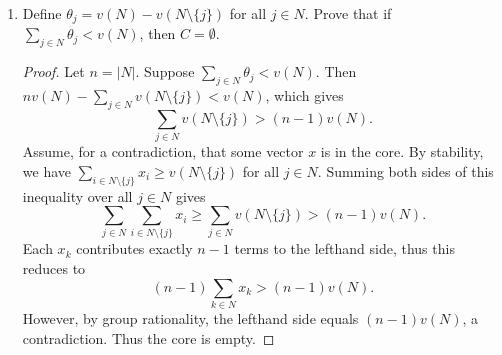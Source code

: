 \documentclass[10pt]{article}
\newcommand{\R}{\mathbb{R}}
\begin{document}
\begin{enumerate}
\noindent \textbf{$C \neq \emptyset$ if and only if $z(|S|) \leq \frac{|S|}{|N|}v(|N|)$ for all $S \subseteq N$.}

\begin{proof}
Let $n = |N|$.  Suppose $z(|S|) \leq \frac{|S|}{n}z(n)$ for all $S \subseteq N$.  Then the vector $x \in \R^n$ defined by $x_i = \frac{z(n)}{n}$ is in the core, since its components sum to $v(N)$ and, for any $S \subseteq N$, we have $\sum\limits_{i \in S} x_i = \frac{s}{n}v(N) \geq v(S)$.

Now, suppose that, for some $s < n$, we have $\frac{s}{n}z(n) < z(s)$, but the core contains some vector $x$.  There are $\binom{n}{s}$ subsets of size $s$, and, for a fixed member $i$, exactly $\binom{n-1}{s-1}$ of them contain $i$.  So
\begin{align*}
\binom{n}{s} z(s) &= \sum\limits_{S \in \{S \subset N : |S| = s\}} z(s)
\\
&\leq \sum\limits_{S \in \{S \subset N : |S| = s\}} \sum_{i \in S} x_i
\\
&= \sum_{i \in N} \binom{n-1}{s-1} x_i
\\
&= \binom{n-1}{s-1}z(n)
\\
&< \binom{n-1}{s-1} \frac{n}{s} z(s)
\\
&= \binom{n}{s} z(s).
\end{align*}
This is a contradiction, so the core must be empty.
\end{proof}
\pagebreak
\item Define $\theta_j = v(N) - v(N \setminus \{j\})$ for all $j \in N$.  Prove that if $\sum\limits_{j \in N} \theta_j < v(N)$, then $C = \emptyset$.

\begin{proof}
Let $n = |N|$.  Suppose $\sum\limits_{j \in N} \theta_j < v(N)$.  Then $nv(N) - \sum\limits_{j \in N} v(N \setminus \{j\}) < v(N)$, which gives
$$
\sum\limits_{j \in N} v(N \setminus \{j\}) > (n-1)v(N).
$$
Assume, for a contradiction, that some vector $x$ is in the core.  By stability, we have $\sum\limits_{i \in N \setminus \{j\}} x_i \geq v(N \setminus \{j\})$ for all $j \in N$.  Summing both sides of this inequality over all $j \in N$ gives
$$
\sum_{j \in N}\sum_{i \in N \setminus \{j\}} x_i \geq \sum_{j \in N} v(N \setminus \{j\}) > (n-1)v(N).
$$
Each $x_k$ contributes exactly $n-1$ terms to the lefthand side, thus this reduces to
$$
(n-1)\sum_{k \in N} x_k > (n-1)v(N).
$$
However, by group rationality, the lefthand side equals $(n-1)v(N)$, a contradiction.  Thus the core is empty.
\end{proof}


\end{enumerate}
\end{document}
